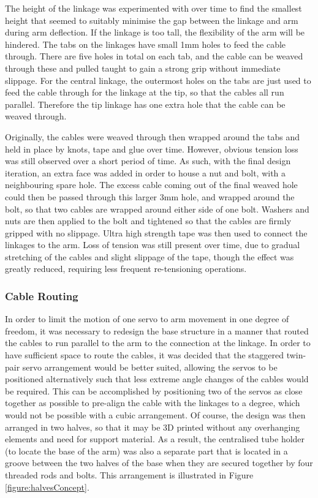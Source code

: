\documentclass[11pt]{article}
\begin{document}
The height of the linkage was experimented with over time to find the smallest height that seemed to suitably minimise the gap between the linkage and arm during arm deflection. If the linkage is too tall, the flexibility of the arm will be hindered. The tabs on the linkages have small 1mm holes to feed the cable through. There are five holes in total on each tab, and the cable can be weaved through these and pulled taught to gain a strong grip without immediate slippage. For the central linkage, the outermost holes on the tabs are just used to feed the cable through for the linkage at the tip, so that the cables all run parallel. Therefore the tip linkage has one extra hole that the cable can be weaved through. 

Originally, the cables were weaved through then wrapped around the tabs and held in place by knots, tape and glue over time. However, obvious tension loss was still observed over a short period of time. As such, with the final design iteration, an extra face was added in order to house a nut and bolt, with a neighbouring spare hole. The excess cable coming out of the final weaved hole could then be passed through this larger 3mm hole, and wrapped around the bolt, so that two cables are wrapped around either side of one bolt. Washers and nuts are then applied to the bolt and tightened so that the cables are firmly gripped with no slippage. Ultra high strength tape was then used to connect the linkages to the arm. Loss of tension was still present over time, due to gradual stretching of the cables and slight slippage of the tape, though the effect was greatly reduced, requiring less frequent re-tensioning operations.

\subsubsection{Cable Routing}
In order to limit the motion of one servo to arm movement in one degree of freedom, it was necessary to redesign the base structure in a manner that routed the cables to run parallel to the arm to the connection at the linkage. In order to have sufficient space to route the cables, it was decided that the staggered twin-pair servo arrangement would be better suited, allowing the servos to be positioned alternatively such that less extreme angle changes of the cables would be required. This can be accomplished by positioning two of the servos as close together as possible to pre-align the cable with the linkages to a degree, which would not be possible with a cubic arrangement. Of course, the design was then arranged in two halves, so that it may be 3D printed without any overhanging elements and need for support material. As a result, the centralised tube holder (to locate the base of the arm) was also a separate part that is located in a groove between the two halves of the base when they are secured together by four threaded rods and bolts. This arrangement is illustrated in Figure \ref{figure:halvesConcept}.
\end{document}
